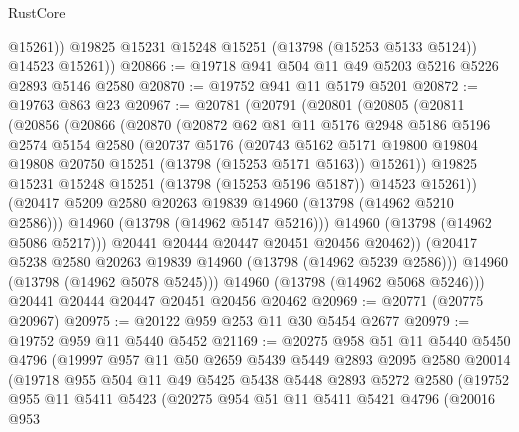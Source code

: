 \begin{lexlean}{RustCore}
\begin{coremodule}
            @15261))
        @19825
        @15231
        @15248
        @15251
        (@13798 (@15253 @5133 @5124))
        @14523
        @15261))
@20866 := @19718 @941 @504 @11 @49 @5203 @5216 @5226 @2893 @5146 @2580
@20870 := @19752 @941 @11 @5179 @5201
@20872 := @19763 @863 @23
@20967 := @20781
    (@20791
      (@20801
        (@20805
          (@20811
            (@20856
              (@20866
                (@20870
                  (@20872
                    @62
                    @81
                    @11
                    @5176
                    @2948
                    @5186
                    @5196
                    @2574
                    @5154
                    @2580
                    (@20737
                      @5176
                      (@20743
                        @5162
                        @5171
                        @19800
                        @19804
                        @19808
                        @20750
                        @15251
                        (@13798 (@15253 @5171 @5163))
                        @15261))
                    @19825
                    @15231
                    @15248
                    @15251
                    (@13798 (@15253 @5196 @5187))
                    @14523
                    @15261))
                (@20417 @5209 @2580 @20263 @19839 @14960 (@13798 (@14962 @5210 @2586)))
                @14960
                (@13798 (@14962 @5147 @5216)))
              @14960
              (@13798 (@14962 @5086 @5217)))
            @20441
            @20444
            @20447
            @20451
            @20456
            @20462))
        (@20417 @5238 @2580 @20263 @19839 @14960 (@13798 (@14962 @5239 @2586)))
        @14960
        (@13798 (@14962 @5078 @5245)))
      @14960
      (@13798 (@14962 @5068 @5246)))
    @20441
    @20444
    @20447
    @20451
    @20456
    @20462
@20969 := @20771 (@20775 @20967)
@20975 := @20122 @959 @253 @11 @30 @5454 @2677
@20979 := @19752 @959 @11 @5440 @5452
@21169 := @20275
    @958
    @51
    @11
    @5440
    @5450
    @4796
    (@19997
      @957
      @11
      @50
      @2659
      @5439
      @5449
      @2893
      @2095
      @2580
      @20014
      (@19718
        @955
        @504
        @11
        @49
        @5425
        @5438
        @5448
        @2893
        @5272
        @2580
        (@19752
          @955
          @11
          @5411
          @5423
          (@20275
            @954
            @51
            @11
            @5411
            @5421
            @4796
            (@20016
              @953

\end{coremodule}
\end{lexlean}

